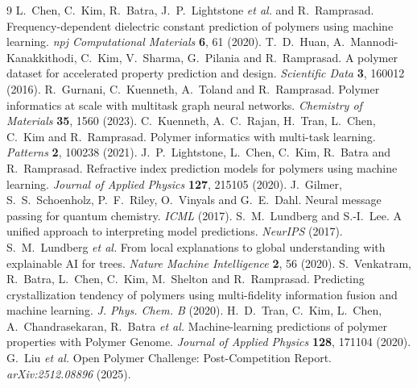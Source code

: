 \documentclass[11pt,a4paper]{article}
\begin{document}
\begin{thebibliography}{9}
\small
{} L.~Chen, C.~Kim, R.~Batra, J.~P.~Lightstone \emph{et al.} and
  R.~Ramprasad. Frequency-dependent dielectric constant prediction of polymers
  using machine learning. \emph{npj Computational Materials} \textbf{6}, 61
  (2020).
 T.~D.~Huan, A.~Mannodi-Kanakkithodi, C.~Kim, V.~Sharma,
  G.~Pilania and R.~Ramprasad. A polymer dataset for accelerated property
  prediction and design. \emph{Scientific Data} \textbf{3}, 160012 (2016).
 R.~Gurnani, C.~Kuenneth, A.~Toland and R.~Ramprasad. Polymer
  informatics at scale with multitask graph neural networks. \emph{Chemistry of
  Materials} \textbf{35}, 1560 (2023).
 C.~Kuenneth, A.~C.~Rajan, H.~Tran, L.~Chen, C.~Kim and
  R.~Ramprasad. Polymer informatics with multi-task learning. \emph{Patterns}
  \textbf{2}, 100238 (2021).
 J.~P.~Lightstone, L.~Chen, C.~Kim, R.~Batra and
  R.~Ramprasad. Refractive index prediction models for polymers using machine
  learning. \emph{Journal of Applied Physics} \textbf{127}, 215105 (2020).
 J.~Gilmer, S.~S.~Schoenholz, P.~F.~Riley, O.~Vinyals and
  G.~E.~Dahl. Neural message passing for quantum chemistry. \emph{ICML} (2017).
 S.~M.~Lundberg and S.-I.~Lee. A unified approach to
  interpreting model predictions. \emph{NeurIPS} (2017).
 S.~M.~Lundberg \emph{et al.} From local explanations to
  global understanding with explainable AI for trees. \emph{Nature Machine
  Intelligence} \textbf{2}, 56 (2020).
 S.~Venkatram, R.~Batra, L.~Chen, C.~Kim, M.~Shelton and
  R.~Ramprasad. Predicting crystallization tendency of polymers using
  multi-fidelity information fusion and machine learning. \emph{J. Phys. Chem.
  B} (2020).
 H.~D.~Tran, C.~Kim, L.~Chen, A.~Chandrasekaran, R.~Batra
  \emph{et al.} Machine-learning predictions of polymer properties with Polymer
  Genome. \emph{Journal of Applied Physics} \textbf{128}, 171104 (2020).
 G.~Liu \emph{et al.} Open Polymer Challenge: Post-Competition
  Report. \emph{arXiv:2512.08896} (2025).
\end{thebibliography}
\end{document}
